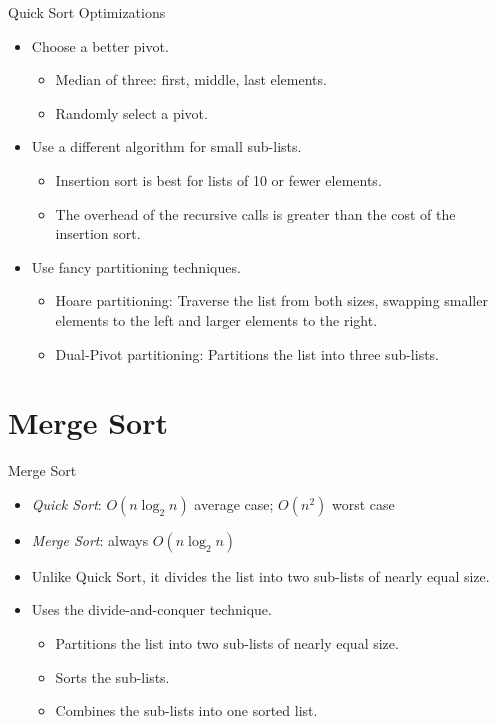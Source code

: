 \documentclass[14pt,aspectratio=1610]{beamer}
\begin{document}
\begin{frame}{Quick Sort Optimizations}
\begin{itemize}
  \item Choose a better pivot.
  \begin{itemize}
    \item Median of three: first, middle, last elements.
    \item Randomly select a pivot.
  \end{itemize}
  \item Use a different algorithm for small sub-lists.
  \begin{itemize}
    \item
      Insertion sort is best for lists of 10 or fewer elements.
    \item
      The overhead of the recursive calls is greater than the cost of the insertion sort.
  \end{itemize}
  \item Use fancy partitioning techniques.
  \begin{itemize}
    \item
      Hoare partitioning: Traverse the list from both sizes, swapping smaller elements to the left and larger elements to the right.
    \item
      Dual-Pivot partitioning: Partitions the list into three sub-lists.
  \end{itemize}
\end{itemize}
\end{frame}

\section{Merge Sort}
\begin{frame}{Merge Sort}
\begin{itemize}
\item
  \emph{Quick Sort}: $O(n\log_2n)$ average case; $O(n^2)$ worst case
\item
  \emph{Merge Sort}: always $O(n\log_2n)$

\item
  Unlike Quick Sort, it divides the list into two sub-lists of nearly equal size.
\item
  Uses the divide-and-conquer technique.
  \begin{itemize}
  \item
    Partitions the list into two sub-lists of nearly equal size.
  \item
    Sorts the sub-lists.
  \item
    Combines the sub-lists into one sorted list.
  \end{itemize}

\end{itemize}
\end{frame}
\end{document}
